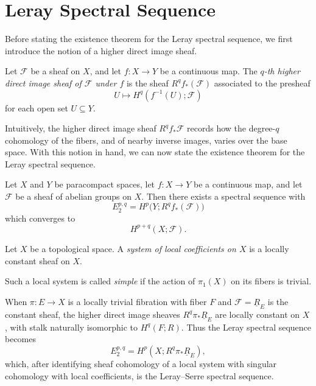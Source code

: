 

\section{Leray Spectral Sequence}

Before stating the existence theorem for the Leray spectral sequence, we first introduce the notion of a higher direct image sheaf.

\begin{definition}
Let $\mathcal{F}$ be a sheaf on $X$, and let $f:X\to Y$ be a continuous map. The \textit{$q$-th higher direct image sheaf of $\mathcal{F}$ under $f$} is the sheaf $R^qf_*(\mathcal{F})$ associated to the presheaf
\begin{equation*}
    U \mapsto H^q(f^{-1}(U);\mathcal{F})
\end{equation*}
for each open set $U\subseteq Y$.
\end{definition}

Intuitively, the higher direct image sheaf $R^qf_*\mathcal{F}$ records how the degree-$q$ cohomology of the fibers, and of nearby inverse images, varies over the base space. With this notion in hand, we can now state the existence theorem for the Leray spectral sequence.

\begin{theorem}
Let $X$ and $Y$ be paracompact spaces, let $f:X\to Y$ be a continuous map, and let $\mathcal{F}$ be a sheaf of abelian groups on $X$. Then there exists a spectral sequence with
\begin{equation*}
    E_2^{p,q}=H^p\bigl(Y;R^qf_*(\mathcal{F})\bigr)
\end{equation*}
which converges to
\begin{equation*}
    H^{p+q}(X;\mathcal{F}).
\end{equation*}
\end{theorem}

\begin{definition}
Let $X$ be a topological space. A \textit{system of local coefficients on $X$} is a locally constant sheaf on $X$.

Such a local system is called \textit{simple} if the action of $\pi_1(X)$ on its fibers is trivial.
\end{definition}

When $\pi:E\to X$ is a locally trivial fibration with fiber $F$ and $\mathcal F=\underline{R}_E$ is the constant sheaf, the higher direct image sheaves $R^q\pi_*\underline{R}_E$ are locally constant on $X$, with stalk naturally isomorphic to $H^q(F;R)$. Thus the Leray spectral sequence becomes
\[
E_2^{p,q}=H^p(X;R^q\pi_*\underline{R}_E),
\]
which, after identifying sheaf cohomology of a local system with singular cohomology with local coefficients, is the Leray--Serre spectral sequence.

